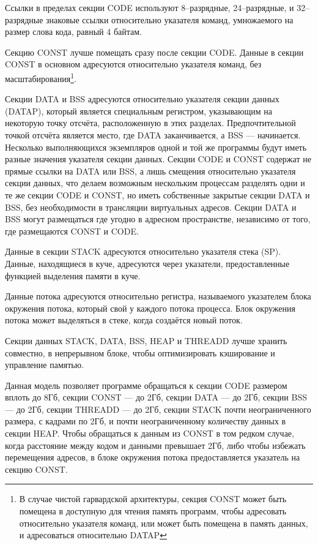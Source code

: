 \documentclass[forwardcom.tex]{subfiles}
\begin{document}
Ссылки в пределах секции CODE используют 8--разрядные, 24--разрядные, и 32--разрядные знаковые ссылки относительно указателя команд, умножаемого на размер слова кода, равный 4 байтам. 

Секцию CONST лучше помещать сразу после секции CODE. Данные в секции CONST в основном адресуются относительно указателя команд, без масштабирования\footnote{В случае чистой гарвардской архитектуры, секция CONST может быть помещена в доступную для чтения память программ, чтобы адресовать относительно указателя команд, или может быть помещена в память данных, и адресоваться относительно DATAP}. 

Секции DATA и BSS адресуются относительно указателя секции данных (DATAP), который является специальным регистром, указывающим на некоторую точку отсчёта, расположенную в этих разделах. Предпочтительной точкой отсчёта является место, где DATA заканчивается, а BSS --- начинается. Несколько выполняющихся экземпляров одной и той же программы будут иметь разные значения указателя секции данных. Секции  CODE и CONST содержат не прямые ссылки на  DATA или BSS, а лишь смещения относительно указателя секции данных, что делаем возможным нескольким процессам разделять одни и те же секции CODE и CONST, но иметь собственные закрытые секции DATA и BSS, без необходимости в трансляции виртуальных адресов. Секции DATA и BSS могут размещаться где угодно в адресном пространстве, независимо от того, где размещаются CONST и CODE.

Данные в секции STACK адресуются относительно указателя стека (SP). Данные, находящиеся в куче, адресуются через указатели, предоставленные функцией выделения памяти в куче.

Данные потока адресуются относительно регистра, называемого указателем блока окружения потока, который свой у каждого потока процесса. Блок окружения потока может выделяться в стеке, когда создаётся новый поток.

Секции данных STACK, DATA, BSS, HEAP и THREADD лучше хранить совместно, в непрерывном блоке, чтобы  оптимизировать кэширование и управление памятью. 

Данная модель позволяет программе обращаться к секции CODE размером вплоть до 8Гб, секции CONST --- до 2Гб, секции DATA --- до 2Гб, секции BSS --- до 2Гб, секции THREADD --- до 2Гб, секции STACK почти неограниченного размера, с кадрами по 2Гб, и почти неограниченному количеству данных в секции HEAP. Чтобы обращаться к данным из CONST в том редком случае, когда расстояние между кодом и данными превышает 2Гб, либо чтобы избежать перемещения адресов, в блоке окружения потока предоставляется указатель на секцию CONST. 
\end{document}
